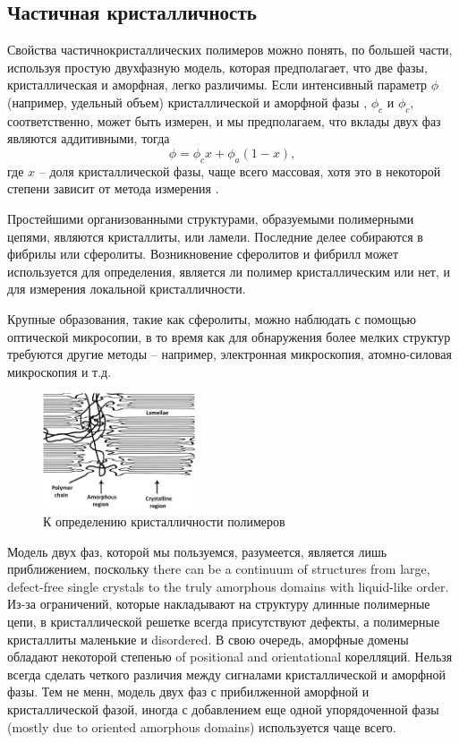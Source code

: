 \subsection{Частичная кристалличность}

Свойства частичнокристаллических полимеров можно понять, по большей части,
используя простую двухфазную модель, которая предполагает, что две фазы, кристаллическая и аморфная, легко различимы. Если интенсивный параметр  $\phi$ (например, удельный объем) кристаллической и аморфной фазы , $\phi_c$ и $\phi_c$, соответственно, может быть измерен, и мы предполагаем, что вклады двух фаз являются аддитивными, тогда
\[ 
\phi = \phi_c x + \phi_a(1-x),
\]
где $x$  -- доля кристаллической фазы, чаще всего массовая, хотя это в некоторой степени зависит от метода измерения \cite{cryst3}.

Простейшими организованными структурами, образуемыми полимерными цепями, являются кристаллиты, или ламели. Последние делее собираются в фибрилы или сферолиты. Возникновение сферолитов и фибрилл может
используется для определения, является ли полимер кристаллическим или нет, и для измерения локальной кристалличности.

Крупные образования, такие как сферолиты, можно наблюдать с помощью оптической микросопии, в то время как для обнаружения более мелких структур требуются другие методы -- например, электронная микроскопия, атомно-силовая микроскопия и т.д.

	\begin{figure} 
\vspace{-20pt}
  \begin{center}
    \includegraphics[width=0.4\textwidth]{fig/crystal-2.jpg}
    \caption{К определению кристалличности полимеров}
    \label{fig:crystal-2}
  \end{center}
  \vspace{-20pt}
  \vspace{1pt}
\end{figure}	

Модель двух фаз, которой мы пользуемся, разумеется, является лишь приближением, поскольку there can be a continuum of structures from large, defect-free single crystals to
the truly amorphous domains with liquid-like order.
Из-за ограничений, которые накладывают на структуру длинные полимерные цепи, в кристаллической решетке всегда присутствуют дефекты, а полимерные кристаллиты маленькие и disordered. В свою очередь, аморфные домены обладают некоторой степенью of positional and orientational корелляций.
Нельзя всегда сделать четкого различия между сигналами кристаллической и аморфной фазы. Тем не менн, модель двух фаз с прибилженной аморфной и кристаллической фазой, иногда с добавлением еще одной упорядоченной фазы
 (mostly due to oriented amorphous domains) используется чаще всего.